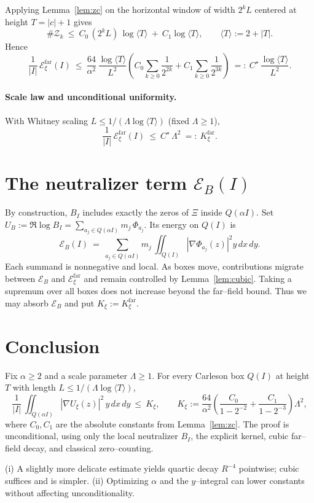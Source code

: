 Applying Lemma~\ref{lem:zc} on the horizontal window of width $2^{k}L$ centered at height $T=|c|+1$ gives
\[
\#\mathcal{Z}_k\ \le\ C_0\,(2^k L)\,\log\langle T\rangle\ +\ C_1\log\langle T\rangle,\qquad \langle T\rangle:=2+|T|.
\]
Hence
\[
\frac{1}{|I|}\,\mathcal{E}^{\mathrm{far}}_{\xi}(I)
\ \le\ \frac{64}{\alpha^2}\,\frac{\log\langle T\rangle}{L^2}\left(C_0 \sum_{k\ge0}\frac{1}{2^{2k}} + C_1\sum_{k\ge0}\frac{1}{2^{3k}}\right)
\ =:\ C^\star\,\frac{\log\langle T\rangle}{L^2}.
\]

\paragraph{Scale law and unconditional uniformity.}
With Whitney scaling $L\le 1/(\Lambda\log\langle T\rangle)$ (fixed $\Lambda\ge 1$),
\[
\frac{1}{|I|}\,\mathcal{E}^{\mathrm{far}}_{\xi}(I)\ \le\ C^\star\,\Lambda^2\ =:\ K_\xi^{\mathrm{far}}.
\]

\section*{The neutralizer term $\mathcal{E}_{B}(I)$}
By construction, $B_I$ includes exactly the zeros of $\Xi$ inside $Q(\alpha I)$. Set $U_B:=\Re\log B_I=\sum_{a_j\in Q(\alpha I)} m_j\,\Phi_{a_j}$. Its energy on $Q(I)$ is
\[
\mathcal{E}_B(I)\ =\ \sum_{a_j\in Q(\alpha I)} m_j\,\iint_{Q(I)} |\nabla\Phi_{a_j}(z)|^2 y\,dx\,dy.
\]
Each summand is nonnegative and local. As boxes move, contributions migrate between $\mathcal{E}_B$ and $\mathcal{E}^{\mathrm{far}}_{\xi}$ and remain controlled by Lemma~\ref{lem:cubic}. Taking a supremum over all boxes does not increase beyond the far–field bound. Thus we may absorb $\mathcal{E}_B$ and put $K_\xi:=K_\xi^{\mathrm{far}}$.

\section*{Conclusion}
\begin{theorem}\label{thm:Kxi}
Fix $\alpha\ge 2$ and a scale parameter $\Lambda\ge 1$. For every Carleson box $Q(I)$ at height $T$ with length $L\le 1/(\Lambda\log\langle T\rangle)$,
\[
\frac{1}{|I|}\,\iint_{Q(\alpha I)} |\nabla U_{\xi}(z)|^2\,y\,dx\,dy\ \le\ K_\xi,
\qquad K_\xi:=\frac{64}{\alpha^2}\left( \frac{C_0}{1-2^{-2}}+\frac{C_1}{1-2^{-3}}\right)\Lambda^2,
\]
where $C_0,C_1$ are the absolute constants from Lemma~\ref{lem:zc}. The proof is unconditional, using only the local neutralizer $B_I$, the explicit kernel, cubic far–field decay, and classical zero–counting.
\end{theorem}

\begin{remark}
(i) A slightly more delicate estimate yields quartic decay $R^{-4}$ pointwise; cubic suffices and is simpler. (ii) Optimizing $\alpha$ and the $y$–integral can lower constants without affecting unconditionality.
\end{remark}
